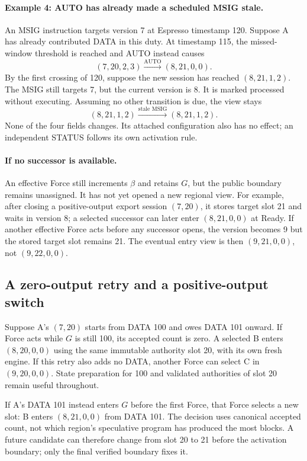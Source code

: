 \documentclass[11pt,a4paper]{article}
\begin{document}
\paragraph{Example 4: AUTO has already made a scheduled MSIG stale.}
An MSIG instruction targets version 7 at Espresso timestamp 120.
Suppose A has already contributed DATA in this duty. At timestamp
115, the missed-window threshold is reached and AUTO instead causes
\[
 (7,20,2,3)\xrightarrow{\text{AUTO}}(8,21,0,0).
\]
By the first crossing of 120, suppose the new session has reached
$(8,21,1,2)$. The MSIG still targets 7, but the current version is 8.
It is marked processed without executing. Assuming no other transition
is due, the view stays
\[
 (8,21,1,2)\xrightarrow{\text{stale MSIG}}(8,21,1,2).
\]
None of the four fields changes. Its attached configuration also has
no effect; an independent STATUS follows its own activation rule.

\paragraph{If no successor is available.}
An effective Force still increments $\beta$ and retains $G$, but the
public boundary remains unassigned. It has not yet opened a new regional view.
For example, after closing a positive-output export session $(7,20)$,
it stores target slot 21 and waits in version 8; a selected successor
can later enter $(8,21,0,0)$ at Ready.
If another effective Force acts before any successor opens, the version
becomes 9 but the stored target slot remains 21. The eventual
entry view is then $(9,21,0,0)$, not $(9,22,0,0)$.

\subsection{A zero-output retry and a positive-output switch}
\label{sec:retry-example}
Suppose A's $(7,20)$ starts from DATA 100 and owes DATA 101 onward.
If Force acts while $G$ is still 100, its accepted count is zero.
A selected B enters $(8,20,0,0)$ using the same immutable authority
slot 20, with its own fresh engine. If this retry also adds no DATA,
another Force can select C in $(9,20,0,0)$. State preparation for 100
and validated authorities of slot 20 remain useful throughout.

If A's DATA 101 instead enters $G$ before the first Force, that Force
selects a new slot: B enters $(8,21,0,0)$ from DATA 101. The decision
uses canonical accepted count, not which region's speculative program
has produced the most blocks. A future candidate can therefore change
from slot 20 to 21 before the activation boundary; only the final
verified boundary fixes it.
\end{document}
